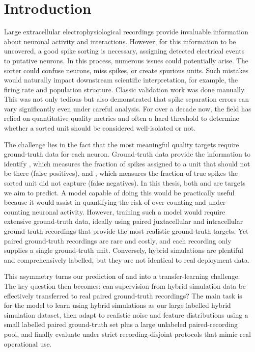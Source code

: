 \chapter{Introduction}
\label{chap:introduction}

Large extracellular electrophysiological recordings provide invaluable information about neuronal activity and interactions. However, for this information to be uncovered, a good spike sorting is necessary, assigning detected electrical events to putative neurons. In this process, numerous issues could potentially arise. The sorter could confuse neurons, miss spikes, or create spurious units. Such mistakes would naturally impact downstream scientific interpretation, for example, the firing rate and population structure. Classic validation work was done manually. This was not only tedious but also demonstrated that spike separation errors can vary significantly even under careful analysis. For over a decade now, the field has relied on quantitative quality metrics \parencite{doi:10.1152/jn.2000.84.1.401,Hill2011} and often a hard threshold to determine whether a sorted unit should be considered well-isolated or not.

The challenge lies in the fact that the most meaningful quality targets require ground-truth data for each neuron. Ground-truth data provide the information to identify \fpos{}, which measures the fraction of spikes assigned to a unit that should not be there (false positives), and \fmiss{}, which measures the fraction of true spikes the sorted unit did not capture (false negatives). In this thesis, both \fpos{} and \fmiss{} are targets we aim to predict. A model capable of doing this would be practically useful because it would assist in quantifying the risk of over-counting and under-counting neuronal activity. However, training such a model would require extensive ground-truth data, ideally using paired juxtacellular and intracellular ground-truth recordings that provide the most realistic ground-truth targets. Yet paired ground-truth recordings are rare and costly, and each recording only supplies a single ground-truth unit. Conversely, hybrid simulations are plentiful and comprehensively labelled, but they are not identical to real deployment data.

This asymmetry turns our prediction of \fpos{} and \fmiss{} into a transfer-learning challenge. The key question then becomes: can supervision from hybrid simulation data be effectively transferred to real paired ground-truth recordings? The main task is for the model to learn using hybrid simulations as our large labelled hybrid simulation dataset, then adapt to realistic noise and feature distributions using a small labelled paired ground-truth set plus a large unlabeled paired-recording pool, and finally evaluate under strict recording-disjoint protocols that mimic real operational use.

